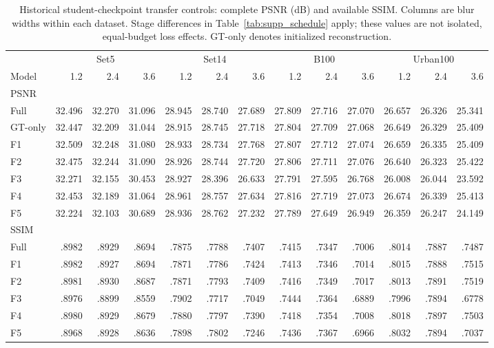 \begin{table}[t]
\caption{Historical student-checkpoint transfer controls: complete PSNR (dB) and available SSIM. Columns are blur widths within each dataset. Stage differences in Table~\ref{tab:supp_schedule} apply; these values are not isolated, equal-budget loss effects. GT-only denotes initialized reconstruction.}
\label{tab:supp_transfer_complete}
\centering\footnotesize
\setlength{\tabcolsep}{3pt}
\begin{tabular}{l|rrr|rrr|rrr|rrr}
\toprule
 & \multicolumn{3}{c|}{Set5} & \multicolumn{3}{c|}{Set14} & \multicolumn{3}{c|}{B100} & \multicolumn{3}{c}{Urban100}\\
Model & 1.2&2.4&3.6&1.2&2.4&3.6&1.2&2.4&3.6&1.2&2.4&3.6\\
\midrule
\multicolumn{13}{l}{PSNR}\\
Full &32.496&32.270&31.096&28.945&28.740&27.689&27.809&27.716&27.070&26.657&26.326&25.341\\
GT-only &32.447&32.209&31.044&28.915&28.745&27.718&27.804&27.709&27.068&26.649&26.329&25.409\\
F1 &32.509&32.248&31.080&28.933&28.734&27.768&27.807&27.712&27.074&26.659&26.335&25.409\\
F2 &32.475&32.244&31.090&28.926&28.744&27.720&27.806&27.711&27.076&26.640&26.323&25.422\\
F3 &32.271&32.155&30.453&28.927&28.396&26.633&27.791&27.595&26.768&26.008&26.044&23.592\\
F4 &32.453&32.189&31.064&28.961&28.757&27.634&27.816&27.719&27.073&26.674&26.339&25.413\\
F5 &32.224&32.103&30.689&28.936&28.762&27.232&27.789&27.649&26.949&26.359&26.247&24.149\\
\midrule
\multicolumn{13}{l}{SSIM}\\
Full &.8982&.8929&.8694&.7875&.7788&.7407&.7415&.7347&.7006&.8014&.7887&.7487\\
F1 &.8982&.8927&.8694&.7871&.7786&.7424&.7413&.7346&.7014&.8015&.7888&.7515\\
F2 &.8981&.8930&.8687&.7871&.7793&.7409&.7416&.7349&.7017&.8013&.7891&.7519\\
F3 &.8976&.8899&.8559&.7902&.7717&.7049&.7444&.7364&.6889&.7996&.7894&.6778\\
F4 &.8980&.8929&.8679&.7880&.7797&.7390&.7418&.7354&.7008&.8018&.7897&.7503\\
F5 &.8968&.8928&.8636&.7898&.7802&.7246&.7436&.7367&.6966&.8032&.7894&.7037\\
\bottomrule
\end{tabular}
\end{table}
